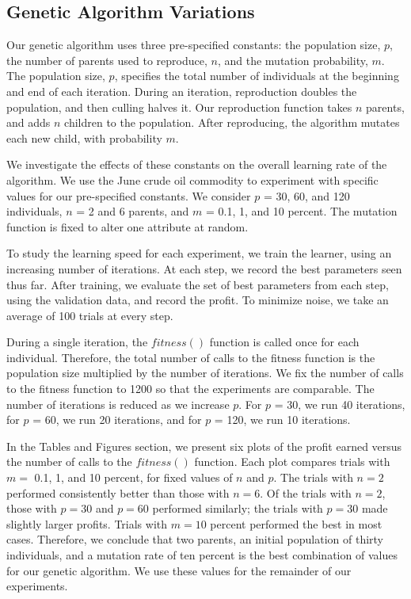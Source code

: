 \documentclass[12pt]{article}
\begin{document}
\subsection{Genetic Algorithm Variations}

Our genetic algorithm uses three pre-specified constants: the population size, $p$, the
number of parents used to reproduce, $n$, and the mutation probability, $m$. The
population size, $p$, specifies the total number of individuals at the beginning
and end of each iteration. During an iteration, reproduction doubles the
population, and then culling halves it. Our reproduction function takes $n$
parents, and adds $n$ children to the population. After reproducing, the
algorithm mutates each new child, with probability $m$.

We investigate the effects of these constants on the overall learning rate of
the algorithm. We use the June crude oil commodity to experiment with specific
values for our pre-specified constants. We consider $p$ = 30, 60, and 120
individuals, $n$ = 2 and 6 parents, and $m$ = 0.1, 1, and 10 percent.  The
mutation function is fixed to alter one attribute at random.

To study the learning speed for each experiment, we train the learner, using an
increasing number of iterations.  At each step, we record the best parameters
seen thus far.  After training, we evaluate the set of best parameters from each
step, using the validation data, and record the profit. To minimize noise, we
take an average of 100 trials at every step.

During a single iteration, the $fitness()$ function is called once for each
individual.  Therefore, the total number of calls to the fitness function is the
population size multiplied by the number of iterations.  We fix the number of
calls to the fitness function to 1200 so that the experiments are
comparable. The number of iterations is reduced as we increase $p$. For $p$ =
30, we run 40 iterations, for $p$ = 60, we run 20 iterations, and for $p$ = 120,
we run 10 iterations.

In the Tables and Figures section, we present six plots of the profit earned
versus the number of calls to the $fitness()$ function.  Each plot compares
trials with $m = $ 0.1, 1, and 10 percent, for fixed values of $n$ and $p$.  The
trials with $n = 2$ performed consistently better than those with $n = 6$.  Of
the trials with $n = 2$, those with $p = 30$ and $p = 60$ performed similarly;
the trials with $p = 30$ made slightly larger profits.  Trials with $m = 10$
percent performed the best in most cases.  Therefore, we conclude that two
parents, an initial population of thirty individuals, and a mutation rate of ten
percent is the best combination of values for our genetic algorithm.  We use
these values for the remainder of our experiments.
\end{document}
